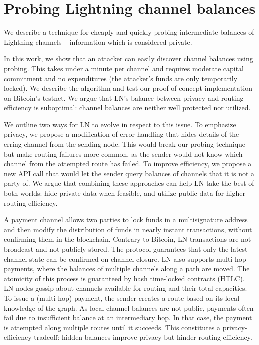 \chapter{Probing Lightning channel balances}

\label{Chapter06LNprobing}

We describe a technique for cheaply and quickly probing intermediate balances of Lightning channels -- information which is considered private.


In this work, we show that an attacker can easily discover channel balances using probing.
This takes under a minute per channel and requires moderate capital commitment and no expenditures (the attacker's funds are only temporarily locked).
We describe the algorithm and test our proof-of-concept implementation on Bitcoin's testnet.
We argue that LN's balance between privacy and routing efficiency is suboptimal: channel balances are neither well protected nor utilized.

We outline two ways for LN to evolve in respect to this issue.
To emphasize privacy, we propose a modification of error handling that hides details of the erring channel from the sending node.
This would break our probing technique but make routing failures more common, as the sender would not know which channel from the attempted route has failed.
To improve efficiency, we propose a new API call that would let the sender query balances of channels that it is not a party of.
We argue that combining these approaches can help LN take the best of both worlds: hide private data when feasible, and utilize public data for higher routing efficiency.

A payment channel allows two parties to lock funds in a multisignature address and then modify the distribution of funds in nearly instant transactions, without confirming them in the blockchain.
Contrary to Bitcoin, LN transactions are not broadcast and not publicly stored.
The protocol guarantees that only the latest channel state can be confirmed on channel closure.
LN also supports multi-hop payments, where the balances of multiple channels along a path are moved.
The atomicity of this process is guaranteed by hash time-locked contracts (HTLC).
LN nodes gossip about channels available for routing and their total capacities.
To issue a (multi-hop) payment, the sender creates a route based on its local knowledge of the graph.
As local channel balances are not public, payments often fail due to insufficient balance at an intermediary hop.
In that case, the payment is attempted along multiple routes until it succeeds.
This constitutes a privacy-efficiency tradeoff: hidden balances improve privacy but hinder routing efficiency.

